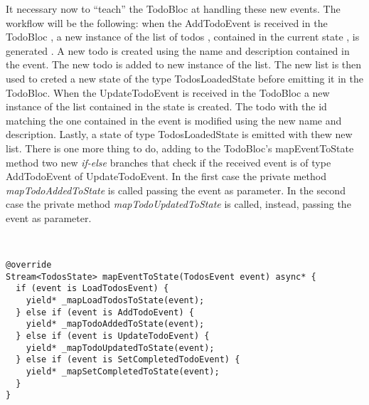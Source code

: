 It necessary now to “teach” the TodoBloc at handling these new events. The workflow will be the following: when the AddTodoEvent is received in the TodoBloc , a new instance of the list of todos , contained in the current state , is generated . A new todo is created using the name and description contained in the event. The new todo is added to new instance of the list. The new list is then used to creted a new state of the type TodosLoadedState before emitting it in the TodoBloc. When the UpdateTodoEvent is received in the TodoBloc a new instance of the list contained in the state is created. The todo with the id matching the one contained in the event is modified using the new name and description. Lastly, a state of type TodosLoadedState is emitted with thew new list. There is one more thing to do, adding to the TodoBloc’s mapEventToState method two new \textit{if-else} branches that check if the received event is of type AddTodoEvent of UpdateTodoEvent. In the first case the private method  \textit{mapTodoAddedToState} is called passing the event as parameter. In the second case the private method \textit{mapTodoUpdatedToState} is called, instead, passing the event as parameter.
\begin{code}
\mbox{}\\
 \mbox{}
\label{code:2.14}
\begin{verbatim}
@override
Stream<TodosState> mapEventToState(TodosEvent event) async* {
  if (event is LoadTodosEvent) {
    yield* _mapLoadTodosToState(event);
  } else if (event is AddTodoEvent) {
    yield* _mapTodoAddedToState(event);
  } else if (event is UpdateTodoEvent) {
    yield* _mapTodoUpdatedToState(event);
  } else if (event is SetCompletedTodoEvent) {
    yield* _mapSetCompletedToState(event);
  } 
}
\end{verbatim}
\mbox{}
\end{code}


